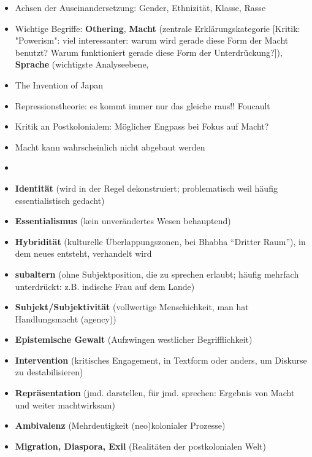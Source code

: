 \documentclass[emulatestandardclasses]{scrartcl}
\begin{document}
\begin{itemize}
  \item Achsen der Auseinandersetzung: Gender, Ethnizität, Klasse, Rasse
  \item Wichtige Begriffe: \textbf{Othering}, \textbf{Macht} (zentrale Erklärungskategorie [Kritik: "Powerism": viel interessanter: warum wird gerade diese Form der Macht benutzt? Warum funktioniert gerade diese Form der Unterdrückung?]), \textbf{Sprache} (wichtigste Analyseebene, 
  \item The Invention of Japan
  \item Repressionstheorie: es kommt immer nur das gleiche raus!! Foucault
  \item Kritik an Postkolonialem: Möglicher Engpass bei Fokus auf Macht?
  \item Macht kann wahrscheinlich nicht abgebaut werden
  \item 
  \item \textbf{Identität} (wird in der Regel dekonstruiert; problematisch weil häufig essentialistisch gedacht)
  \item \textbf{Essentialismus} (kein unverändertes Wesen behauptend)
  \item \textbf{Hybridität} (kulturelle Überlappungszonen, bei Bhabha "`Dritter Raum"'), in dem neues entsteht, verhandelt wird
  \item \textbf{subaltern} (ohne Subjektposition, die zu sprechen erlaubt; häufig mehrfach unterdrückt: z.B. indische Frau auf dem Lande)
  \item \textbf{Subjekt/Subjektivität} (vollwertige Menschichkeit, man hat Handlungsmacht (agency))
  \item \textbf{Epistemische Gewalt} (Aufzwingen westlicher Begrifflichkeit)
  \item \textbf{Intervention} (kritisches Engagement, in Textform oder anders, um Diskurse zu destabilisieren)
  \item \textbf{Repräsentation} (jmd. darstellen, für jmd. sprechen: Ergebnis von Macht und weiter machtwirksam)
  \item \textbf{Ambivalenz} (Mehrdeutigkeit (neo)kolonialer Prozesse)
  \item \textbf{Migration, Diaspora, Exil} (Realitäten der postkolonialen Welt)
\end{itemize}


\newpage
\end{document}

